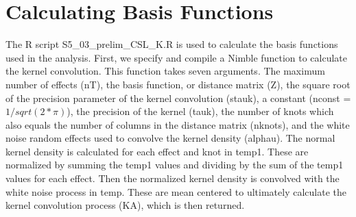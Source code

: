 \documentclass[11pt,]{article}
\newenvironment{Shaded}{\begin{snugshade}}{\end{snugshade}}
\newcommand{\KeywordTok}[1]{\textcolor[rgb]{0.13,0.29,0.53}{\textbf{#1}}}
\newcommand{\DecValTok}[1]{\textcolor[rgb]{0.00,0.00,0.81}{#1}}
\newcommand{\StringTok}[1]{\textcolor[rgb]{0.31,0.60,0.02}{#1}}
\newcommand{\CommentTok}[1]{\textcolor[rgb]{0.56,0.35,0.01}{\textit{#1}}}
\newcommand{\OperatorTok}[1]{\textcolor[rgb]{0.81,0.36,0.00}{\textbf{#1}}}
\newcommand{\NormalTok}[1]{#1}
\begin{document}
\begin{Shaded}
\end{Shaded}

\section{Calculating Basis Functions}\label{calculating-basis-functions}

The R script S5\_03\_prelim\_CSL\_K.R is used to calculate the basis
functions used in the analysis. First, we specify and compile a Nimble
function to calculate the kernel convolution. This function takes seven
arguments. The maximum number of effects (nT), the basis function, or
distance matrix (Z), the square root of the precision parameter of the
kernel convolution (stauk), a constant (nconst = \(1 / sqrt(2 * \pi)\)),
the precision of the kernel (tauk), the number of knots which also
equals the number of columns in the distance matrix (nknots), and the
white noise random effects used to convolve the kernel density (alphau).
The normal kernel density is calculated for each effect and knot in
temp1. These are normalized by summing the temp1 values and dividing by
the sum of the temp1 values for each effect. Then the normalized kernel
density is convolved with the white noise process in temp. These are
mean centered to ultimately calculate the kernel convolution process
(KA), which is then returned.
\end{document}
